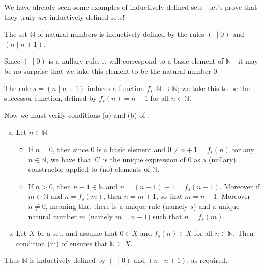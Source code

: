 We have already seen some examples of inductively defined sets---let's prove that they truly \textit{are} inductively defined sets!

\begin{proposition}
\label{propNIsInductivelyDefined}
The set $\mathbb{N}$ of natural numbers is inductively defined by the rules $(~ \mid 0)$ and $(n \mid n+1)$.
\end{proposition}

\begin{cproof}
Since $(~ \mid 0)$ is a nullary rule, it will correspond to a basic element of $\mathbb{N}$---it may be no surprise that we take this element to be the natural number $0$.

The rule $s = (n \mid n+1)$ induces a function $f_s : \mathbb{N} \to \mathbb{N}$; we take this to be the successor function, defined by $f_s(n) = n+1$ for all $n \in \mathbb{N}$.

Now we must verify conditions (a) and (b) of .
\begin{enumerate}[(a)]
\item Let $n \in \mathbb{N}$.
\begin{itemize}
\item If $n = 0$, then since $0$ is a basic element and $0 \ne n+1 = f_s(n)$ for any $n \in \mathbb{N}$, we have that `$0$' is the unique expression of $0$ as a (nullary) constructor applied to (no) elements of $\mathbb{N}$.
\item If $n > 0$, then $n-1 \in \mathbb{N}$ and $n = (n-1)+1 = f_s(n-1)$. Moreover if $m \in \mathbb{N}$ and $n=f_s(m)$, then $n=m+1$, so that $m=n-1$. Moreover $n \ne 0$, meaning that there is a unique rule (namely $s$) and a unique natural number $m$ (namely $m=n-1$) such that $n=f_s(m)$.
\end{itemize}
\item Let $X$ be a set, and assume that $0 \in X$ and $f_s(n) \in X$ for all $n \in \mathbb{N}$. Then condition (iii) of  ensures that $\mathbb{N} \subseteq X$.
\end{enumerate}

Thus $\mathbb{N}$ is inductively defined by $(~ \mid 0)$ and $(n \mid n+1)$, as required.
\end{cproof}

